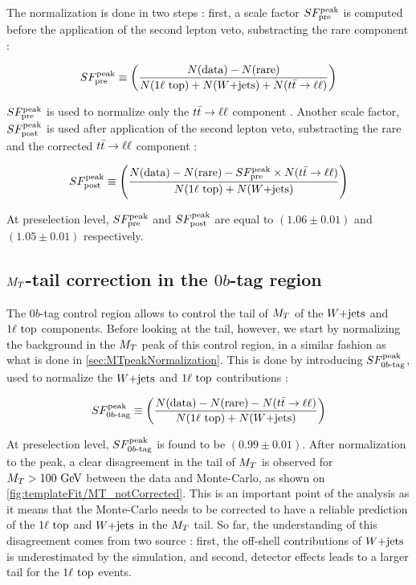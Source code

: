             The normalization is done in two steps : first, a scale factor $SF_{\text{pre}}^{\text{peak}}$ is
            computed before the application of the second lepton veto, substracting the rare component :

            \begin{equation}
                SF_{\text{pre}}^{\text{peak}} \equiv \left( \frac{N(\text{data}) - N(\text{rare})}{N(1\ell~\text{top}) + N(\text{$W$+jets}) + N(t\bar{t} \rightarrow \ell \ell)} \right)
                \label{eq:SFpreDefinition}
            \end{equation}

            $SF_{\text{pre}}^{\text{peak}}$ is used to normalize only the $t\bar{t} \rightarrow \ell \ell$ component . Another scale factor, $SF_{\text{post}}^{\text{peak}}$ is used after application of the second lepton veto, substracting the rare and the corrected $t\bar{t} \rightarrow \ell \ell$ component :

            \begin{equation}
                SF_{\text{post}}^{\text{peak}} \equiv \left( \frac{N(\text{data}) - N(\text{rare}) - SF_{\text{pre}}^{\text{peak}} \times N(t\bar{t} \rightarrow \ell \ell)}{N(1\ell~\text{top}) + N(\text{$W$+jets})} \right)
                \label{eq:SFpostDefinition}
            \end{equation}

            At preselection level, $SF_{\text{pre}}^{\text{peak}}$ and $SF_{\text{post}}^{\text{peak}}$ are equal to $(1.06 \pm 0.01)$ and $(1.05 \pm 0.01)$ respectively.

        \subsection{$M_T$-tail correction in the $0b$-tag region \label{sec:MTtailCorrection}}

        The $0b$-tag control region allows to control the tail of $M_T$ of the $\text{$W$+jets}$ and $1\ell~\text{top}$ components. Before looking at the tail, however, we start by normalizing the background in the $M_T$ peak of this control region, in a similar fashion as what is done in \ref{sec:MTpeakNormalization}. This is done by introducing $SF_{0b\text{-tag}}^{\text{peak}}$, used to normalize the $\text{$W$+jets}$ and $1\ell~\text{top}$ contributions :

        \begin{equation}
            SF_{0b\text{-tag}}^{\text{peak}} \equiv \left( \frac{N(\text{data}) - N(\text{rare}) - N(t\bar{t} \rightarrow \ell \ell)}{N(1\ell~\text{top}) + N(\text{$W$+jets})} \right)
            \label{eq:SF0btagDefinition}
        \end{equation}

        At preselection level, $SF_{0b\text{-tag}}^{\text{peak}}$ is found to be $(0.99 \pm 0.01)$. After normalization to the peak, a clear disagreement in the tail of $M_T$ is observed for $M_T > 100 ~\text{GeV}$ between the data and Monte-Carlo, as shown on \ref{fig:templateFit/MT_notCorrected}. This is an important point of the analysis as it means that the Monte-Carlo needs to be corrected to have a reliable prediction of the $1\ell~\text{top}$ and $\text{$W$+jets}$ in the $M_T$ tail. So far, the understanding of this disagreement comes from two source : first, the off-shell contributions of $\text{$W$+jets}$ is underestimated by the simulation, and second, detector effects leads to a larger tail for the $1\ell~\text{top}$ events.

